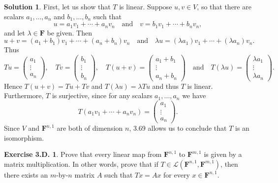 \documentclass[12pt]{article}
\theoremstyle{definition}
\theoremstyle{exercise}
\newtheorem{exercise}{Exercise 3.D.}
\theoremstyle{solution}
\newtheorem*{solution}{Solution}
\newcommand{\lmap}{\mathcal{L}}
\newcommand{\quand}{\quad \text{and} \quad}
\newcommand{\F}{\mathbf{F}}
\begin{document}
\begin{solution}
    First, let us show that \( T \) is linear. Suppose \( u, v \in V \), so that there are scalars \( a_1, \ldots, a_n \) and \( b_1, \ldots, b_n \) such that
    \[
        u = a_1 v_1 + \cdots + a_n v_n \quand v = b_1 v_1 + \cdots + b_n v_n,
    \]
    and let \( \lambda \in \F \) be given. Then
    \[
        u + v = (a_1 + b_1) v_1 + \cdots + (a_n + b_n) v_n \quand \lambda u = (\lambda a_1) v_1 + \cdots + (\lambda a_n) v_n.
    \]
    Thus
    \[
        Tu = \begin{pmatrix}
            a_1 \\ \vdots \\ a_n
        \end{pmatrix}, \quad
        Tv = \begin{pmatrix}
            b_1 \\ \vdots \\ b_n
        \end{pmatrix}, \quad
        T(u + v) = \begin{pmatrix}
            a_1 + b_1 \\ \vdots \\ a_n + b_n
        \end{pmatrix} \quand
        T(\lambda u) = \begin{pmatrix}
            \lambda a_1 \\ \vdots \\ \lambda a_n
        \end{pmatrix}.
    \]
    Hence \( T(u + v) = Tu + Tv \) and \( T(\lambda u) = \lambda Tu \) and thus \( T \) is linear. Furthermore, \( T \) is surjective, since for any scalars \( a_1, \ldots, a_n \) we have
    \[
        T(a_1 v_1 + \cdots + a_n v_n) = \begin{pmatrix}
            a_1 \\ \vdots \\ a_n
        \end{pmatrix}.
    \]
    Since \( V \) and \( \F^{n,1} \) are both of dimension \( n \), 3.69 allows us to conclude that \( T \) is an isomorphism.
\end{solution}

\begin{exercise}
\label{ex:15}
    Prove that every linear map from \( \F^{n,1} \) to \( \F^{m,1} \) is given by a matrix multiplication. In other words, prove that if \( T \in \lmap(\F^{n,1}, \F^{m,1}) \), then there exists an \(m\)-by-\(n\) matrix \( A \) such that \( Tx = Ax \) for every \( x \in \F^{n,1} \).
\end{exercise}
\end{document}
